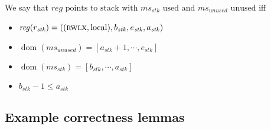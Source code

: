 \documentclass[format=acmsmall, review=true, screen=true]{acmart}
\DeclareMathOperator{\dom}{dom}
\newcommand\lau[1]{{\color{purple} \sf \footnotesize {LS: #1}}\\}
\renewcommand\lau[1]{}
\newcommand{\var}[1]{\mathit{#1}}
\newcommand{\hs}{\var{ms}}
\newcommand{\ms}{\hs}
\newcommand{\reg}{\var{reg}}
\newcommand{\stk}{\var{stk}}
\newcommand{\plainperm}[1]{\textsc{#1}}
\newcommand{\rwlx}{\plainperm{rwlx}}
\newcommand{\plainlocality}[1]{\mathrm{#1}}
\newcommand{\local}{\plainlocality{local}}
\begin{document}
\begin{definition}
  We say that $\reg \text{ points to stack with $\ms_\stk$ used and $\ms_{\mathit{unused}}$ unused}$
  iff
  \begin{itemize}
  \item $\reg(r_\stk) =((\rwlx,\local),b_\stk,e_\stk,a_\stk)$
  \item $\dom(\ms_{\mathit{unused}}) = [a_\stk+1,\cdots,e_\stk]$
  \item $\dom(\ms_\stk) = [b_\stk,\cdots,a_\stk]$ \lau{Maybe make it clear what happens when $\ms_\stk$ is empty}
  \item $b_\stk - 1\leq a_\stk$
  \end{itemize}
\end{definition}


 \subsection{Example correctness lemmas}
\end{document}

